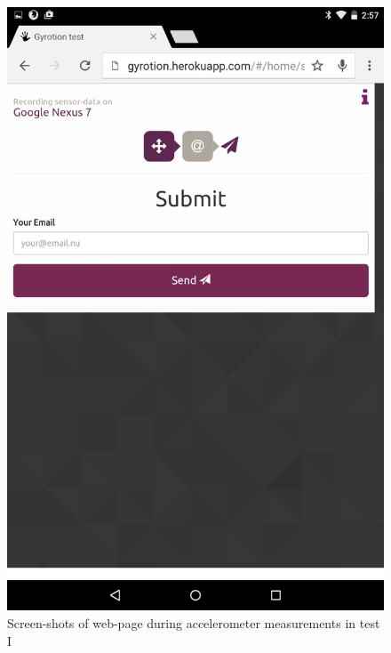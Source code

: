 \begin{figure}[H]
\begin{minipage}[c]{.23\textwidth}
    \includegraphics[scale=0.1]{img/Nexus-submit}
  \end{minipage}
  \caption{Screen-shots of web-page during accelerometer measurements in test I}
  \label{fig:gyrotion}
\end{figure}

